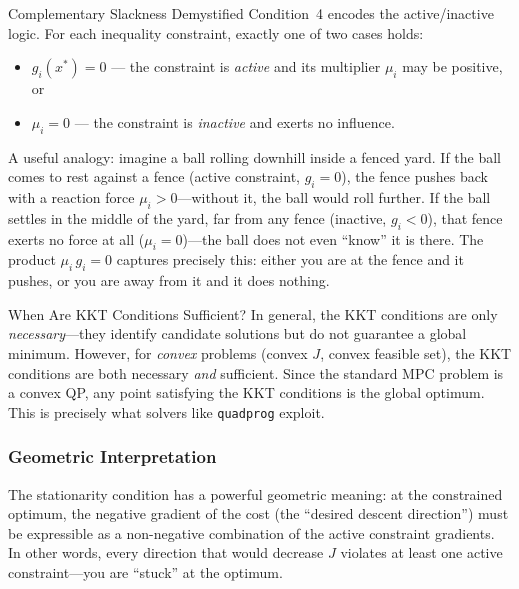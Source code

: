 \begin{notebox}{Complementary Slackness Demystified}
	Condition~4 encodes the active/inactive logic. For each inequality constraint, exactly one of two cases holds:
	\begin{itemize}
		\item $g_i(x^*) = 0$ --- the constraint is \emph{active} and its multiplier $\mu_i$ may be positive, or
		\item $\mu_i = 0$ --- the constraint is \emph{inactive} and exerts no influence.
	\end{itemize}
	A useful analogy: imagine a ball rolling downhill inside a fenced yard. If the ball comes to rest against a fence (active constraint, $g_i = 0$), the fence pushes back with a reaction force $\mu_i > 0$---without it, the ball would roll further. If the ball settles in the middle of the yard, far from any fence (inactive, $g_i < 0$), that fence exerts no force at all ($\mu_i = 0$)---the ball does not even ``know'' it is there. The product $\mu_i\,g_i = 0$ captures precisely this: either you are at the fence and it pushes, or you are away from it and it does nothing.
\end{notebox}

\begin{alertbox}{When Are KKT Conditions Sufficient?}
	In general, the KKT conditions are only \emph{necessary}---they identify candidate solutions but do not guarantee a global minimum. However, for \emph{convex} problems (convex $J$, convex feasible set), the KKT conditions are both necessary \emph{and} sufficient. Since the standard MPC problem is a convex QP, any point satisfying the KKT conditions is the global optimum. This is precisely what solvers like \texttt{quadprog} exploit.
\end{alertbox}


\subsubsection{Geometric Interpretation}

The stationarity condition has a powerful geometric meaning: at the constrained optimum, the negative gradient of the cost (the ``desired descent direction'') must be expressible as a non-negative combination of the active constraint gradients. In other words, every direction that would decrease $J$ violates at least one active constraint---you are ``stuck'' at the optimum.


